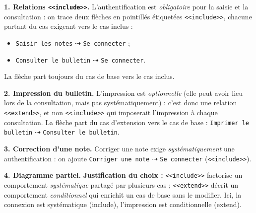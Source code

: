 \documentclass[11pt]{article}
\begin{document}
\begin{corrige}
\textbf{1. Relations \texttt{<<include>>}.} L'authentification est \emph{obligatoire} pour la saisie et la consultation : on trace deux flèches en pointillés étiquetées \texttt{<<include>>}, chacune partant du cas exigeant vers le cas inclus :
\begin{itemize}
\item \texttt{Saisir les notes} $\dashrightarrow$ \texttt{Se connecter} ;
\item \texttt{Consulter le bulletin} $\dashrightarrow$ \texttt{Se connecter}.
\end{itemize}
La flèche part toujours du cas de base vers le cas inclus.

\textbf{2. Impression du bulletin.} L'impression est \emph{optionnelle} (elle peut avoir lieu lors de la consultation, mais pas systématiquement) : c'est donc une relation \texttt{<<extend>>}, et non \texttt{<<include>>} qui imposerait l'impression à chaque consultation. La flèche part du cas d'extension vers le cas de base : \texttt{Imprimer le bulletin} $\dashrightarrow$ \texttt{Consulter le bulletin}.

\textbf{3. Correction d'une note.} Corriger une note exige \emph{systématiquement} une authentification : on ajoute \texttt{Corriger une note} $\dashrightarrow$ \texttt{Se connecter} (\texttt{<<include>>}).

\textbf{4. Diagramme partiel.}
\textbf{Justification du choix :} \texttt{<<include>>} factorise un comportement \emph{systématique} partagé par plusieurs cas ; \texttt{<<extend>>} décrit un comportement \emph{conditionnel} qui enrichit un cas de base sans le modifier. Ici, la connexion est systématique (include), l'impression est conditionnelle (extend).
\end{corrige}
\end{document}
